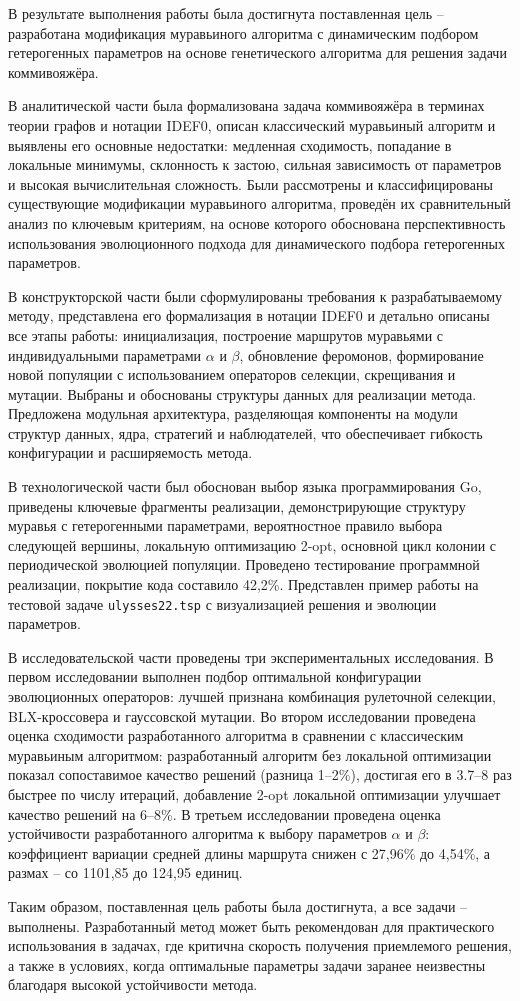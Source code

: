 
В результате выполнения работы была достигнута поставленная цель -- разработана модификация муравьиного алгоритма с динамическим подбором гетерогенных параметров на основе генетического алгоритма для решения задачи коммивояжёра.

В аналитической части была формализована задача коммивояжёра в терминах теории графов и нотации IDEF0, описан классический муравьиный алгоритм и выявлены его основные недостатки: медленная сходимость, попадание в локальные минимумы, склонность к застою, сильная зависимость от параметров и высокая вычислительная сложность. Были рассмотрены и классифицированы существующие модификации муравьиного алгоритма, проведён их сравнительный анализ по ключевым критериям, на основе которого обоснована перспективность использования эволюционного подхода для динамического подбора гетерогенных параметров.

В конструкторской части были сформулированы требования к разрабатываемому методу, представлена его формализация в нотации IDEF0 и детально описаны все этапы работы: инициализация, построение маршрутов муравьями с индивидуальными параметрами $\alpha$ и $\beta$, обновление феромонов, формирование новой популяции с использованием операторов селекции, скрещивания и мутации. Выбраны и обоснованы структуры данных для реализации метода. Предложена модульная архитектура, разделяющая компоненты на модули структур данных, ядра, стратегий и наблюдателей, что обеспечивает гибкость конфигурации и расширяемость метода.

В технологической части был обоснован выбор языка программирования Go, приведены ключевые фрагменты реализации, демонстрирующие структуру муравья с гетерогенными параметрами, вероятностное правило выбора следующей вершины, локальную оптимизацию 2-opt, основной цикл колонии с периодической эволюцией популяции. Проведено тестирование программной реализации, покрытие кода составило 42,2\%. Представлен пример работы на тестовой задаче \texttt{ulysses22.tsp} с визуализацией решения и эволюции параметров.

В исследовательской части проведены три экспериментальных исследования. В первом исследовании выполнен подбор оптимальной конфигурации эволюционных операторов: лучшей признана комбинация рулеточной селекции, BLX-кроссовера и гауссовской мутации. Во втором исследовании проведена оценка сходимости разработанного алгоритма в сравнении с классическим муравьиным алгоритмом: разработанный алгоритм без локальной оптимизации показал сопоставимое качество решений (разница 1–2\%), достигая его в 3.7–8 раз быстрее по числу итераций, добавление 2-opt локальной оптимизации улучшает качество решений на 6–8\%. В третьем исследовании проведена оценка устойчивости разработанного алгоритма к выбору параметров $\alpha$ и $\beta$: коэффициент вариации средней длины маршрута снижен с 27,96\% до 4,54\%, а размах -- со 1101,85 до 124,95 единиц.

Таким образом, поставленная цель работы была достигнута, а все задачи -- выполнены. Разработанный метод может быть рекомендован для практического использования в задачах, где критична скорость получения приемлемого решения, а также в условиях, когда оптимальные параметры задачи заранее неизвестны благодаря высокой устойчивости метода.
